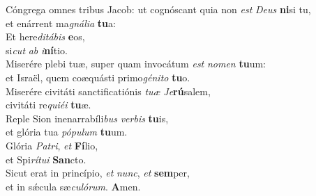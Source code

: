 \evenverse Cóngrega omnes tribus Jacob: ut cognóscant quia non \textit{est} \textit{De}\textit{us} \textbf{ni}si tu,~\*\\
\evenverse et enárrent ma\textit{gná}\textit{li}\textit{a} \textbf{tu}a:\\
\oddverse Et here\textit{di}\textit{tá}\textit{bis} \textbf{e}os,~\*\\
\oddverse si\textit{cut} \textit{ab} \textit{i}\textbf{ní}tio.\\
\evenverse Miserére plebi tuæ, super quam invocátum \textit{est} \textit{no}\textit{men} \textbf{tu}um:~\*\\
\evenverse et Israël, quem coæquásti primo\textit{gé}\textit{ni}\textit{to} \textbf{tu}o.\\
\oddverse Miserére civitáti sanctificatiónis \textit{tu}\textit{æ} \textit{Je}\textbf{rú}salem,~\*\\
\oddverse civitáti re\textit{qui}\textit{é}\textit{i} \textbf{tu}æ.\\
\evenverse Reple Sion inenarrabíli\textit{bus} \textit{ver}\textit{bis} \textbf{tu}is,~\*\\
\evenverse et glória tua \textit{pó}\textit{pu}\textit{lum} \textbf{tu}um.\\
\oddverse Glória \textit{Pa}\textit{tri}, \textit{et} \textbf{Fí}lio,~\*\\
\oddverse et Spi\textit{rí}\textit{tu}\textit{i} \textbf{San}cto.\\
\evenverse Sicut erat in princípio, \textit{et} \textit{nunc}, \textit{et} \textbf{sem}per,~\*\\
\evenverse et in sǽcula sæ\textit{cu}\textit{ló}\textit{rum}. \textbf{A}men.\\
